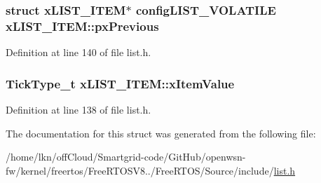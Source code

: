 \subsubsection[{\texorpdfstring{px\+Previous}{pxPrevious}}]{\setlength{\rightskip}{0pt plus 5cm}struct {\bf x\+L\+I\+S\+T\+\_\+\+I\+T\+EM}$\ast$ {\bf config\+L\+I\+S\+T\+\_\+\+V\+O\+L\+A\+T\+I\+LE} x\+L\+I\+S\+T\+\_\+\+I\+T\+E\+M\+::px\+Previous}\hypertarget{structx_l_i_s_t___i_t_e_m_ae8e553eae41010a8e41c66d76c94110b}{}\label{structx_l_i_s_t___i_t_e_m_ae8e553eae41010a8e41c66d76c94110b}


Definition at line 140 of file list.\+h.

\subsubsection[{\texorpdfstring{x\+Item\+Value}{xItemValue}}]{ {\bf Tick\+Type\+\_\+t} x\+L\+I\+S\+T\+\_\+\+I\+T\+E\+M\+::x\+Item\+Value}\hypertarget{structx_l_i_s_t___i_t_e_m_a943ec2a4a53818cbc380079cb33c8e59}{}\label{structx_l_i_s_t___i_t_e_m_a943ec2a4a53818cbc380079cb33c8e59}


Definition at line 138 of file list.\+h.



The documentation for this struct was generated from the following file\+:\begin{DoxyCompactItemize}
\item 
/home/lkn/off\+Cloud/\+Smartgrid-\/code/\+Git\+Hub/openwsn-\/fw/kernel/freertos/\+Free\+R\+T\+O\+S\+V8../\+Free\+R\+T\+O\+S/\+Source/include/\hyperlink{list_8h}{list.\+h}\end{DoxyCompactItemize}
